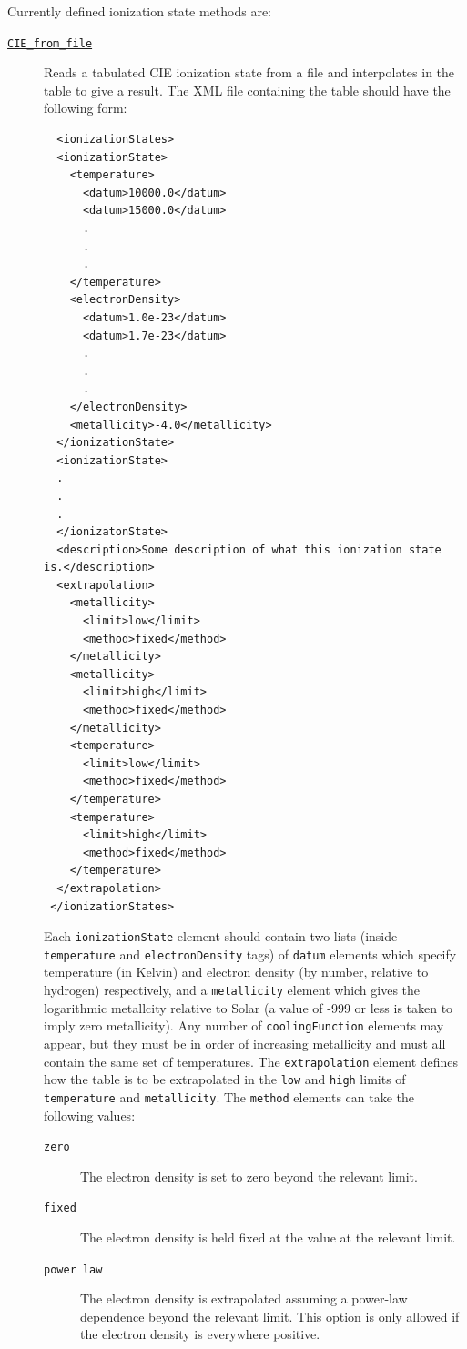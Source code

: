 Currently defined ionization state methods are:
\begin{description}
 \item [\hyperlink{atomic.ionization_state.CIE_file.F90:ionization_states_cie_file:electron_density_cie_file}{{\tt CIE\_from\_file}}] Reads a tabulated CIE ionization state from a file and interpolates in the table to give a result. The XML file containing the table should have the following form:
 \begin{verbatim}
  <ionizationStates>
  <ionizationState>
    <temperature>
      <datum>10000.0</datum>
      <datum>15000.0</datum>
      .
      .
      .
    </temperature>
    <electronDensity>
      <datum>1.0e-23</datum>
      <datum>1.7e-23</datum>
      .
      .
      .
    </electronDensity>
    <metallicity>-4.0</metallicity>
  </ionizationState>
  <ionizationState>
  .
  .
  .
  </ionizatonState>
  <description>Some description of what this ionization state is.</description>
  <extrapolation>
    <metallicity>
      <limit>low</limit>
      <method>fixed</method>
    </metallicity>
    <metallicity>
      <limit>high</limit>
      <method>fixed</method>
    </metallicity>
    <temperature>
      <limit>low</limit>
      <method>fixed</method>
    </temperature>
    <temperature>
      <limit>high</limit>
      <method>fixed</method>
    </temperature>
  </extrapolation>
 </ionizationStates>
 \end{verbatim}
 Each {\tt ionizationState} element should contain two lists (inside {\tt temperature} and {\tt electronDensity} tags) of {\tt datum} elements which specify temperature (in Kelvin) and electron density (by number, relative to hydrogen) respectively, and a {\tt metallicity} element which gives the logarithmic metallcity relative to Solar (a value of -999 or less is taken to imply zero metallicity). Any number of {\tt coolingFunction} elements may appear, but they must be in order of increasing metallicity and must all contain the same set of temperatures. The {\tt extrapolation} element defines how the table is to be extrapolated in the {\tt low} and {\tt high} limits of {\tt temperature} and {\tt metallicity}. The {\tt method} elements can take the following values:
 \begin{description}
  \item[{\tt zero}] The electron density is set to zero beyond the relevant limit.
  \item[{\tt fixed}] The electron density is held fixed at the value at the relevant limit.
  \item[{\tt power law}] The electron density is extrapolated assuming a power-law dependence beyond the relevant limit. This option is only allowed if the electron density is everywhere positive.

\end{description}
\end{description}
